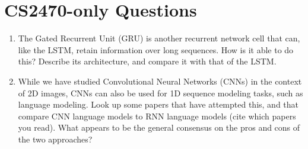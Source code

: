 \documentclass{article}
\begin{document}
\section{CS2470-only Questions}

\begin{enumerate}
\item The Gated Recurrent Unit (GRU) is another recurrent network cell that can, like the LSTM, retain information over long sequences. How is it able to do this? Describe its architecture, and compare it with that of the LSTM.

\item While we have studied Convolutional Neural Networks (CNNs) in the context of 2D images, CNNs can also be used for 1D sequence modeling tasks, such as language modeling. Look up some papers that have attempted this, and that compare CNN language models to RNN language models (cite which papers you read). What appears to be the general consensus on the pros and cons of the two approaches?
\end{enumerate}
\end{document}
